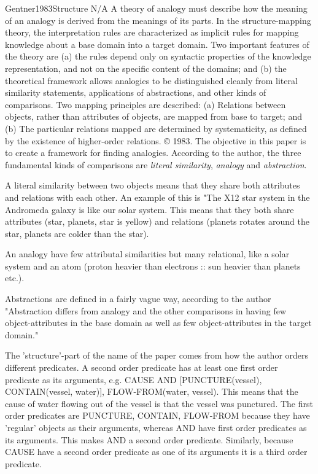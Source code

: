 \documentclass[10pt]{article}
\begin{document}
\begin{review}{Gentner1983Structure}
        {N/A}
        {
            A theory of analogy must describe how the meaning of an analogy is derived from the meanings of its parts. 
            In the structure-mapping theory, the interpretation rules are characterized as implicit rules for mapping knowledge about a base domain into a target domain. 
            Two important features of the theory are (a) the rules depend only on syntactic properties of the knowledge representation, and not on the specific content of the domains; and (b) the theoretical framework allows analogies to be distinguished cleanly from literal similarity statements, applications of abstractions, and other kinds of comparisons. 
            Two mapping principles are described: (a) Relations between objects, rather than attributes of objects, are mapped from base to target; and (b) The particular relations mapped are determined by systematicity, as defined by the existence of higher-order relations. © 1983.
        }
    The objective in this paper is to create a framework for finding analogies.
    According to the author, the three fundamental kinds of comparisons are \emph{literal similarity}, \emph{analogy} and \emph{abstraction}.
    
    A literal similarity between two objects means that they share both attributes and relations with each other.
    An example of this is "The X12 star system in the Andromeda galaxy is like our solar system.
    This means that they both share attributes (star, planets, star is yellow) and relations (planets rotates around the star, planets are colder than the star).
    
    An analogy have few attributal similarities but many relational, like a solar system and an atom (proton heavier than electrons :: sun heavier than planets etc.).
    
    Abstractions are defined in a fairly vague way, according to the author "Abstraction differs from analogy and the other comparisons in having few object-attributes in the base domain as well as few object-attributes in the target domain."
    
    The 'structure'-part of the name of the paper comes from how the author orders different predicates.
    A second order predicate has at least one first order predicate as its arguments, e.g. CAUSE {AND [PUNCTURE(vessel), CONTAIN(vessel, water)], FLOW-FROM(water, vessel)}.
    This means that the cause of water flowing out of the vessel is that the vessel was punctured.
    The first order predicates are PUNCTURE, CONTAIN, FLOW-FROM because they have 'regular' objects as their arguments, whereas AND have first order predicates as its arguments.
    This makes AND a second order predicate.
    Similarly,  because CAUSE have a second order predicate as one of its arguments it is a third order predicate.
    

\end{review}
\end{document}
